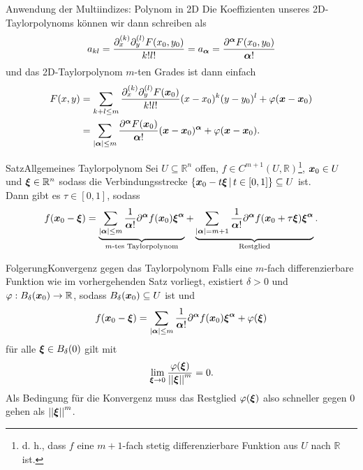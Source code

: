 \begin{Beispiel}
{Anwendung der Multiindizes: Polynom in 2D}
Die Koeffizienten unseres 2D-Taylorpolynoms können wir dann schreiben als
\begin{equation*}
    a_{kl}=\frac{\partial_x^{(k)}\partial_y^{(l)}F(x_0,y_0)}{k!l!}=a_{\alphavec}=\frac{\partial^{\alphavec}F(x_0,y_0)}{\alphavec!}
\end{equation*}
und das 2D-Taylorpolynom $m$-ten Grades ist dann einfach
\begin{align*}
    F(x,y)&=\sum_{k+l\leq m}\frac{\partial_x^{(k)}\partial_y^{(l)}F(\xvec_0)  }{k!l!}(x-x_0)^k(y-y_0)^l+\varphi(\xvec-\xvec_0)\\
    &=\sum_{\Abs{\alphavec}\leq m}\frac{\partial^{\alphavec}F(\xvec_0)}{\alphavec!}(\xvec-\xvec_0)^\alphavec+\varphi(\xvec-\xvec_0).
\end{align*}
\end{Beispiel}
\begin{Satz}
{Satz}{Allgemeines Taylorpolynom}
Sei $U\subseteq \mathbb{R}^n$ offen, $f\in C^{m+1}(U,\mathbb{R})$\footnote{d. h., dass $f$ eine $m+1$-fach stetig differenzierbare Funktion aus $U$ nach $\mathbb{R}$ ist.}, $\xvec_0\in U$ und $\xivec\in \mathbb{R}^n$ sodass die Verbindungsstrecke $\Menge{\xvec_0-t\xivec}{t\in[0,1]}\subseteq U$ ist.\\
Dann gibt es $\tau\in[0,1]$, sodass
\begin{equation}
    f(\xvec_0-\xivec)=\underbrace{\sum_{\Abs{\alphavec}\leq m}\frac{1}{\alphavec!}\partial^\alphavec f(\xvec_0)\xivec^\alphavec}_{m\tx{-tes Taylorpolynom}}+\underbrace{\sum_{\Abs{\alphavec}=m+1}\frac{1}{\alphavec!}\partial^\alphavec f(\xvec_0+\tau\xivec)\xivec^\alphavec}_{\tx{Restglied}}.
\end{equation}
\end{Satz}
\begin{Satz}
{Folgerung}{Konvergenz gegen das Taylorpolynom}
Falls eine $m$-fach differenzierbare Funktion wie im vorhergehenden Satz vorliegt, existiert $\delta>0$ und $\varphi:B_\delta(\xvec_0)\to\mathbb{R}$, sodass $B_\delta(\xvec_0)\subseteq U$ ist und 
\begin{equation}
    f(\xvec_0-\xivec)=\sum_{\Abs{\alphavec}\leq m}\frac{1}{\alphavec!}\partial^\alphavec f(\xvec_0)\xivec^\alphavec + \varphi(\xivec)
\end{equation}
für alle $\xivec\in B_\delta(0)$ gilt mit 
\begin{equation}
    \lim_{\xivec\to0}\frac{\varphi(\xivec)}{\Norm{\xivec}^m}=0.
\end{equation}
Als Bedingung für die Konvergenz muss das Restglied $\varphi(\xivec)$ also schneller gegen 0 gehen als $\Norm{\xivec}^m$.
\end{Satz}
